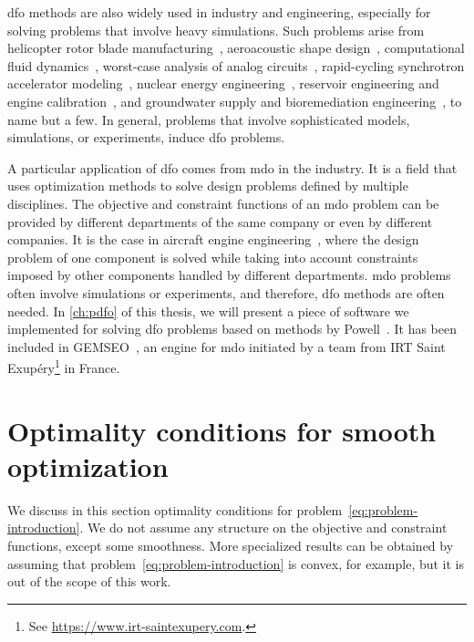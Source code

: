 \Gls{dfo} methods are also widely used in industry and engineering, especially for solving problems that involve heavy simulations.
Such problems arise from helicopter rotor blade manufacturing~\cite{Booker_Etal_1998a,Booker_Etal_1998b,Serafini_1998}, aeroacoustic shape design~\cite{Marsden_2004,Marsden_Etal_2004}, computational fluid dynamics~\cite{Duvigneau_Visonneau_2004}, worst-case analysis of analog circuits~\cite{Latorre_Etal_2019}, rapid-cycling synchrotron accelerator modeling~\cite{Eldred_Etal_2021}, nuclear energy engineering~\cite{Kortelainen_Etal_2010,Kortelainen_Etal_2012,Kortelainen_Etal_2014}, reservoir engineering and engine calibration~\cite{Langouet_2011}, and groundwater supply and bioremediation engineering~\cite{Fowler_Etal_2008,Mugunthan_Shoemaker_Regis_2005,Yoon_Shoemaker_1999}, to name but a few.
In general, problems that involve sophisticated models, simulations, or experiments, induce \gls{dfo} problems.

A particular application of \gls{dfo} comes from \gls{mdo} in the industry.
It is a field that uses optimization methods to solve design problems defined by multiple disciplines.
The objective and constraint functions of an \gls{mdo} problem can be provided by different departments of the same company or even by different companies.
It is the case in aircraft engine engineering~\cite{Gazaix_Etal_2019}, where the design problem of one component is solved while taking into account constraints imposed by other components handled by different departments.
\Gls{mdo} problems often involve simulations or experiments, and therefore, \gls{dfo} methods are often needed.
In \cref{ch:pdfo} of this thesis, we will present a piece of software we implemented for solving \gls{dfo} problems based on methods by Powell~\cite{Powell_1994,Powell_2002,Powell_2006,Powell_2009,Powell_2015}.
It has been included in GEMSEO~\cite{Gallard_Etal_2018}, an engine for \gls{mdo} initiated by a team from IRT Saint Exup{\'{e}}ry\footnote{See \url{https://www.irt-saintexupery.com}.} in France.

\section{Optimality conditions for smooth optimization}
\label{sec:optimality-conditions}

We discuss in this section optimality conditions for problem~\cref{eq:problem-introduction}.
We do not assume any structure on the objective and constraint functions, except some smoothness.
More specialized results can be obtained by assuming that problem~\cref{eq:problem-introduction} is convex, for example, but it is out of the scope of this work.

